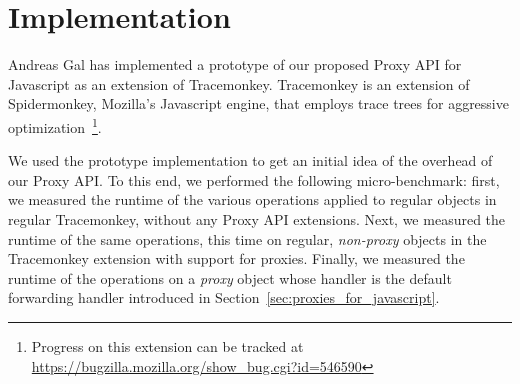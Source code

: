 \documentclass{sig-alternate}
\begin{document}



\section{Implementation}
\label{sub:benchmarks}

Andreas Gal has implemented a prototype of our proposed Proxy API for Javascript as an extension of Tracemonkey. Tracemonkey is an extension of Spidermonkey, Mozilla's Javascript engine, that employs trace trees for aggressive optimization~\cite{gal06efficient}\footnote{Progress on this extension can be tracked at \url{https://bugzilla.mozilla.org/show_bug.cgi?id=546590}}.

We used the prototype implementation to get an initial idea of the overhead of our Proxy API. To this end, we performed the following micro-benchmark: first, we measured the runtime of the various operations applied to regular objects in regular Tracemonkey, without any Proxy API extensions. Next, we measured the runtime of the same operations, this time on regular, \emph{non-proxy} objects in the Tracemonkey extension with support for proxies. Finally, we measured the runtime of the operations on a \emph{proxy} object whose handler is the default forwarding handler introduced in Section~\ref{sec:proxies_for_javascript}.
\end{document}
